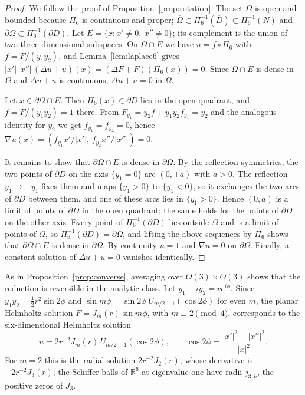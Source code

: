 \documentclass[11pt]{amsart}
\theoremstyle{definition}
\theoremstyle{remark}
\numberwithin{equation}{section}
\newcommand{\R}{\mathbb{R}}
\begin{document}
\begin{proof}
We follow the proof of Proposition~\ref{prop:rotation}. The set $\Omega$ is open and bounded because $\Pi_6$ is continuous and proper; $\overline\Omega\subset\Pi_6^{-1}(\overline D)\subset\Pi_6^{-1}(N)$ and $\partial\Omega\subset\Pi_6^{-1}(\partial D)$. Let $E=\{x:x'\neq0,\ x''\neq0\}$; its complement is the union of two three-dimensional subspaces. On $\Omega\cap E$ we have $u=f\circ\Pi_6$ with $f=F/(y_1y_2)$, and Lemma~\ref{lem:laplace6} gives $|x'|\,|x''|\,(\Delta u+u)(x)=(\Delta F+F)(\Pi_6(x))=0$. Since $\Omega\cap E$ is dense in $\Omega$ and $\Delta u+u$ is continuous, $\Delta u+u=0$ in $\Omega$.

Let $x\in\partial\Omega\cap E$. Then $\Pi_6(x)\in\partial D$ lies in the open quadrant, and $f=F/(y_1y_2)=1$ there. From $F_{y_1}=y_2f+y_1y_2f_{y_1}=y_2$ and the analogous identity for $y_2$ we get $f_{y_1}=f_{y_2}=0$, hence $\nabla u(x)=(f_{y_1}x'/|x'|,\,f_{y_2}x''/|x''|)=0$.

It remains to show that $\partial\Omega\cap E$ is dense in $\partial\Omega$. By the reflection symmetries, the two points of $\partial D$ on the axis $\{y_1=0\}$ are $(0,\pm a)$ with $a>0$. The reflection $y_1\mapsto-y_1$ fixes them and maps $\{y_1>0\}$ to $\{y_1<0\}$, so it exchanges the two arcs of $\partial D$ between them, and one of these arcs lies in $\{y_1>0\}$. Hence $(0,a)$ is a limit of points of $\partial D$ in the open quadrant; the same holds for the points of $\partial D$ on the other axis. Every point of $\Pi_6^{-1}(\partial D)$ lies outside $\Omega$ and is a limit of points of $\Omega$, so $\Pi_6^{-1}(\partial D)=\partial\Omega$, and lifting the above sequences by $\Pi_6$ shows that $\partial\Omega\cap E$ is dense in $\partial\Omega$. By continuity $u=1$ and $\nabla u=0$ on $\partial\Omega$. Finally, a constant solution of $\Delta u+u=0$ vanishes identically.
\end{proof}

As in Proposition~\ref{prop:converse}, averaging over $O(3)\times O(3)$ shows that the reduction is reversible in the analytic class. Let $y_1+iy_2=re^{i\phi}$. Since $y_1y_2=\frac12r^2\sin2\phi$ and $\sin m\phi=\sin2\phi\;U_{m/2-1}(\cos2\phi)$ for even $m$, the planar Helmholtz solution $F=J_m(r)\sin m\phi$, with $m\equiv2\pmod4$, corresponds to the six-dimensional Helmholtz solution
\[
u=2r^{-2}J_m(r)\,U_{m/2-1}(\cos2\phi),\qquad\cos2\phi=\frac{|x'|^2-|x''|^2}{|x|^2}.
\]
For $m=2$ this is the radial solution $2r^{-2}J_2(r)$, whose derivative is $-2r^{-2}J_3(r)$; the Schiffer balls of $\R^6$ at eigenvalue one have radii $j_{3,k}$, the positive zeros of $J_3$.
\end{document}
